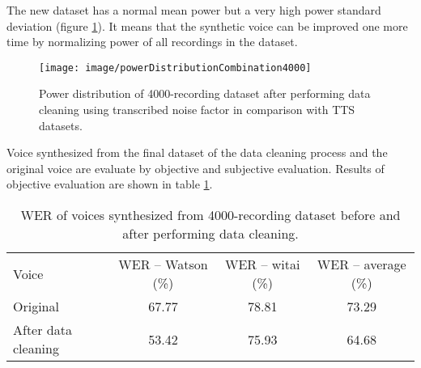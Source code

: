 \documentclass[12pt]{article}
\begin{document}
The new dataset has a normal mean power but a very high power standard deviation (figure \ref{fig_powerDistributionCombination4000}). It means that the synthetic voice can be improved one more time by normalizing power of all recordings in the dataset.

\begin{figure}[t]
\begin{center}
\texttt{[image: image/powerDistributionCombination4000]}
\end{center}
\vspace{-0.3cm}
\caption[power distribution combination 4000.]{Power distribution of 4000-recording dataset after performing data cleaning using transcribed noise factor in comparison with TTS datasets.}
\label{fig_powerDistributionCombination4000}
\end{figure}

Voice synthesized from the final dataset of the data cleaning process and the original voice are evaluate by objective and subjective evaluation. Results of objective evaluation are shown in table \ref{tab_werCombination4000}.

\begin{table}[]
\begin{center}
\caption{WER of voices synthesized from 4000-recording dataset before and after performing data cleaning.}
\label{tab_werCombination4000}
\vspace{3mm}
\begin{tabular}{lccc}
\hline
Voice & WER – Watson (\%) & WER – witai (\%) & WER – average (\%)\\
\cmidrule(l{0pt}r{2pt}){1-1}\cmidrule(l{0pt}r{2pt}){2-2}\cmidrule(l{0pt}r{2pt}){3-3}\cmidrule(l{0pt}r{2pt}){4-4}
Original            & 67.77 & 78.81 & 73.29 \\
After data cleaning & 53.42 & 75.93 & 64.68 \\
\hline
\end{tabular}
\end{center}
\end{table}





\newpage
\end{document}
